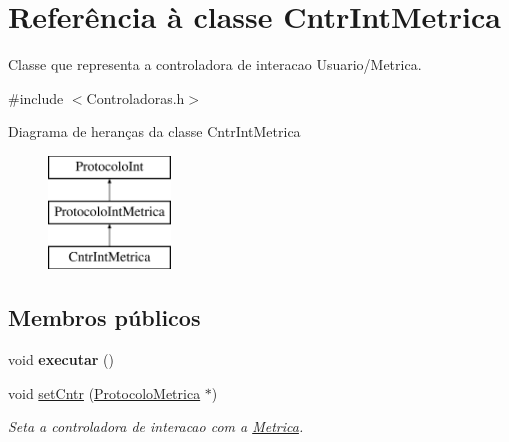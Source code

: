 \hypertarget{class_cntr_int_metrica}{
\section{\-Referência à classe \-Cntr\-Int\-Metrica}
\label{class_cntr_int_metrica}
}


\-Classe que representa a controladora de interacao \-Usuario/\-Metrica.  




{\ttfamily \#include $<$\-Controladoras.\-h$>$}

\-Diagrama de heranças da classe \-Cntr\-Int\-Metrica\begin{figure}[H]
\begin{center}
\leavevmode
\includegraphics[height=3.000000cm]{class_cntr_int_metrica}
\end{center}
\end{figure}
\subsection*{\-Membros públicos}
\begin{DoxyCompactItemize}
\item 
\hypertarget{class_cntr_int_metrica_adbf52a7806ae74e10053c226d1a631de}{
void {\bfseries executar} ()}
\label{class_cntr_int_metrica_adbf52a7806ae74e10053c226d1a631de}

\item 
void \hyperlink{class_cntr_int_metrica_a9efa0fa35a6e7af59bebc8e6963fdc87}{set\-Cntr} (\hyperlink{class_protocolo_metrica}{\-Protocolo\-Metrica} $\ast$)
\begin{DoxyCompactList}\small\item\em \-Seta a controladora de interacao com a \hyperlink{class_metrica}{\-Metrica}. \end{DoxyCompactList}\end{DoxyCompactItemize}
